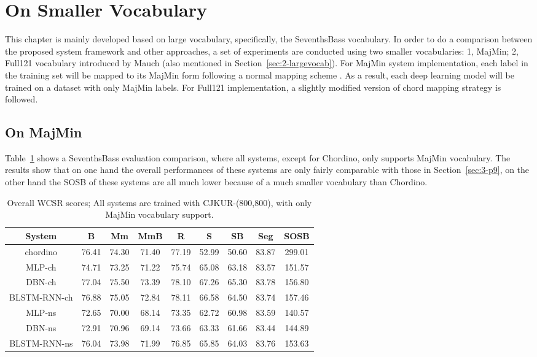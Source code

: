 \section{On Smaller Vocabulary}
This chapter is mainly developed based on large vocabulary, specifically, the SeventhsBass vocabulary. In order to do a comparison between the proposed system framework and other approaches, a set of experiments are conducted using two smaller vocabularies: 1, MajMin; 2, Full121 vocabulary introduced by Mauch \cite{mauch2010automatic} (also mentioned in Section~\ref{sec:2-largevocab}). For MajMin system implementation, each label in the training set will be mapped to its MajMin form following a normal mapping scheme \cite{harte2010towards,pauwels2013evaluating}. As a result, each deep learning model will be trained on a dataset with only MajMin labels. For Full121 implementation, a slightly modified version of chord mapping strategy \cite{mauch2010automatic} is followed.

\subsection{On MajMin}
Table~\ref{tab:3-overallres} shows a SeventhsBass evaluation comparison, where all systems, except for Chordino, only supports MajMin vocabulary. The results show that on one hand the overall performances of these systems are only fairly comparable with those in Section~\ref{sec:3-p9}, on the other hand the SOSB of these systems are all much lower because of a much smaller vocabulary than Chordino.
\begin{table}[h]
\footnotesize
\centering
\caption{Overall WCSR scores; All systems are trained with CJKUR-(800,800), with only MajMin vocabulary support.}
\label{tab:3-overallres}
\begin{tabular}{|c|c|c|c|c|c|c|c|c|}\hline
System & B & Mm & MmB & R & S & SB & Seg & SOSB \\ \hline
chordino & 76.41 & 74.30 & 71.40 & 77.19 & 52.99 & 50.60 & 83.87 & 299.01\\ \hline
MLP-ch & 74.71 & 73.25 & 71.22 & 75.74 & 65.08 & 63.18 & 83.57 & 151.57\\ \hline
DBN-ch & 77.04 & 75.50 & 73.39 & 78.10 & 67.26 & 65.30 & 83.78 & 156.80\\ \hline
BLSTM-RNN-ch & 76.88 & 75.05 & 72.84 & 78.11 & 66.58 & 64.50 & 83.74 & 157.46\\ \hline
MLP-ns & 72.65 & 70.00 & 68.14 & 73.35 & 62.72 & 60.98 & 83.59 & 140.57\\ \hline
DBN-ns & 72.91 & 70.96 & 69.14 & 73.66 & 63.33 & 61.66 & 83.44 & 144.89\\ \hline
BLSTM-RNN-ns & 76.04 & 73.98 & 71.99 & 76.85 & 65.85 & 64.03 & 83.76 & 153.63\\ \hline
\end{tabular}
\end{table}

